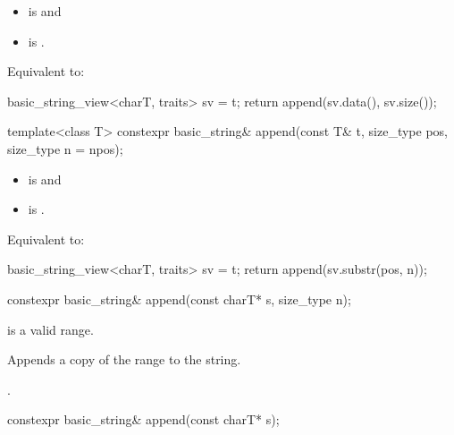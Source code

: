 \begin{itemdescr}
\pnum
\constraints
\begin{itemize}
\item
{} is
 and
\item
{} is
.
\end{itemize}

\pnum
\effects
Equivalent to:
\begin{codeblock}
basic_string_view<charT, traits> sv = t;
return append(sv.data(), sv.size());
\end{codeblock}
\end{itemdescr}

%
\begin{itemdecl}
template<class T>
  constexpr basic_string& append(const T& t, size_type pos, size_type n = npos);
\end{itemdecl}

\begin{itemdescr}
\pnum
\constraints
\begin{itemize}
\item
{} is
 and
\item
{} is
.
\end{itemize}

\pnum
\effects
Equivalent to:
\begin{codeblock}
basic_string_view<charT, traits> sv = t;
return append(sv.substr(pos, n));
\end{codeblock}
\end{itemdescr}

%
\begin{itemdecl}
constexpr basic_string& append(const charT* s, size_type n);
\end{itemdecl}

\begin{itemdescr}
\pnum
\expects
{} is a valid range.

\pnum
\effects
Appends a copy of the range  to the string.

\pnum
\returns
{}.
\end{itemdescr}

%
\begin{itemdecl}
constexpr basic_string& append(const charT* s);
\end{itemdecl}

